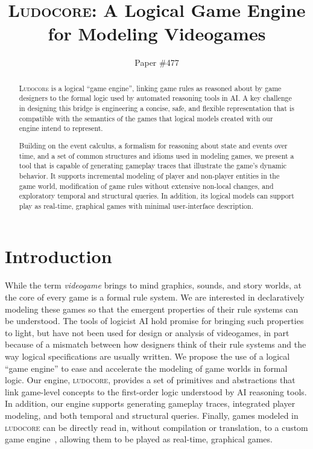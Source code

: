 \documentclass[letterpaper]{article}
\newcommand{\ludocore}{\textsc{ludocore}}
\newcommand{\Ludocore}{\textsc{Ludocore}}
\begin{document}
\title{\textsc{Ludocore}: A Logical Game Engine for Modeling Videogames}
\author{Paper \#477}
\maketitle
\begin{abstract}

\Ludocore{} is a logical ``game engine'', linking game rules as reasoned about by
game designers to the formal logic used by automated reasoning tools in AI.
A key challenge in designing this bridge is engineering a concise, safe, and
flexible representation that is compatible with the semantics of the games that
logical models created with our engine intend to represent.

Building on the event calculus, a formalism for reasoning about state and
events over time, and a set of common structures and idioms used in
modeling games, we present a tool that is capable of generating gameplay traces
that illustrate the game's dynamic behavior. It supports incremental modeling
of player and non-player entities in the game world, modification of game
rules without extensive non-local changes, and exploratory temporal and
structural queries. In addition, its logical models can support play as
real-time, graphical games with minimal user-interface description.

\end{abstract}

\section{Introduction}

While the term \emph{videogame} brings to mind graphics, sounds, and 
story worlds, at the core of every game is a formal rule system. We are
interested in declaratively modeling these games so that the emergent
properties of their rule systems can be understood. The tools of logicist AI
hold promise for bringing such properties to light, but have not been used for
design or analysis of videogames, in part because of a mismatch between how
designers think of their rule systems and the way logical specifications are
usually written. We propose the use of a logical ``game engine'' to ease and
accelerate the modeling of game worlds in formal logic. Our engine, \ludocore,
provides a set of primitives and abstractions that link game-level concepts to
the first-order logic understood by AI reasoning tools. In addition, our
engine supports generating gameplay traces, integrated player modeling,
and both temporal and structural queries. Finally, games modeled in \ludocore{}
can be directly read in, without compilation or translation, to a custom game
engine~\citep{AIIDE09}, allowing them to be played as real-time, graphical games.
\end{document}
